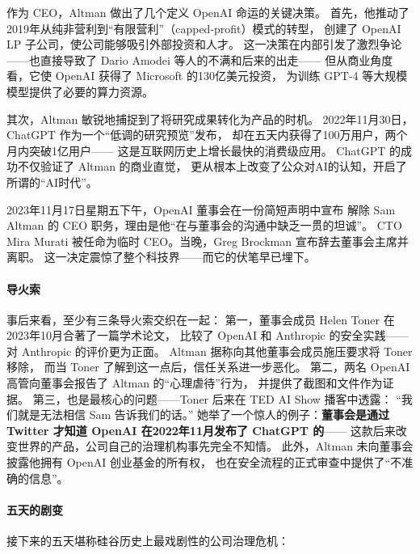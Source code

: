 作为 CEO，Altman 做出了几个定义 OpenAI 命运的关键决策。
首先，他推动了2019年从纯非营利到``有限营利''（capped-profit）模式的转型，
创建了 OpenAI LP 子公司，使公司能够吸引外部投资和人才。
这一决策在内部引发了激烈争论——也直接导致了 Dario Amodei 等人的不满和后来的出走——
但从商业角度看，它使 OpenAI 获得了 Microsoft 的130亿美元投资，
为训练 GPT-4 等大规模模型提供了必要的算力资源。

其次，Altman 敏锐地捕捉到了将研究成果转化为产品的时机。
2022年11月30日，ChatGPT 作为一个``低调的研究预览''发布，
却在五天内获得了100万用户，两个月内突破1亿用户——
这是互联网历史上增长最快的消费级应用。
ChatGPT 的成功不仅验证了 Altman 的商业直觉，
更从根本上改变了公众对AI的认知，开启了所谓的``AI时代''。

\begin{whybox}
2023年11月17日星期五下午，OpenAI 董事会在一份简短声明中宣布
解除 Sam Altman 的 CEO 职务，理由是他``在与董事会的沟通中缺乏一贯的坦诚''。
CTO Mira Murati 被任命为临时 CEO。当晚，Greg Brockman 宣布辞去董事会主席并离职。
这一决定震惊了整个科技界——而它的伏笔早已埋下。

\paragraph{导火索}
事后来看，至少有三条导火索交织在一起：
第一，董事会成员 Helen Toner 在2023年10月合著了一篇学术论文，
比较了 OpenAI 和 Anthropic 的安全实践——对 Anthropic 的评价更为正面。
Altman 据称向其他董事会成员施压要求将 Toner 移除，
而当 Toner 了解到这一点后，信任关系进一步恶化。
第二，两名 OpenAI 高管向董事会报告了 Altman 的``心理虐待''行为，
并提供了截图和文件作为证据。
第三，也是最核心的问题——Toner 后来在 TED AI Show 播客中透露：
``我们就是无法相信 Sam 告诉我们的话。''
她举了一个惊人的例子：\textbf{董事会是通过 Twitter 才知道
OpenAI 在2022年11月发布了 ChatGPT 的}——
这款后来改变世界的产品，公司自己的治理机构事先完全不知情。
此外，Altman 未向董事会披露他拥有 OpenAI 创业基金的所有权，
也在安全流程的正式审查中提供了``不准确的信息''。

\paragraph{五天的剧变}
接下来的五天堪称硅谷历史上最戏剧性的公司治理危机：


\end{whybox}
